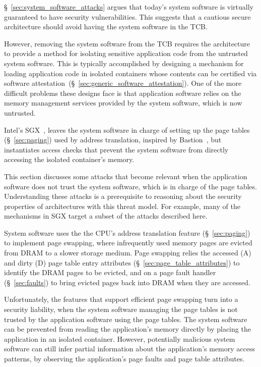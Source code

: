\label{sec:address_translation_attacks}

\S~\ref{sec:system_software_attacks} argues that today's system software is
virtually guaranteed to have security vulnerabilities. This suggests that a
cautious secure architecture should avoid having the system software in the
TCB.

However, removing the system software from the TCB requires the architecture to
provide a method for isolating sensitive application code from the untrusted
system software. This is typically accomplished by designing a mechanism for
loading application code in isolated containers whose contents can be certified
via software attestation~(\S~\ref{sec:generic_software_attestation}). One of the
more difficult problems these designs face is that application software
relies on the memory management services provided by the system software, which
is now untrusted.

Intel's SGX~\cite{mckeen2013sgx, anati2013sgx}, leaves the system software in
charge of setting up the page tables (\S~\ref{sec:paging}) used by address
translation, inspired by Bastion~\cite{champagne2010bastion}, but instantiates
access checks that prevent the system software from directly accessing the
isolated container's memory.

This section discusses some attacks that become relevant when the application
software does not trust the system software, which is in charge of the page
tables. Understanding these attacks is a prerequisite to reasoning about the
security properties of architectures with this threat model. For example, many
of the mechanisms in SGX target a subset of the attacks described here.


\label{sec:fault_tracking_attacks}

System software uses the the CPU's address translation feature
(\S~\ref{sec:paging}) to implement page swapping, where infrequently used
memory pages are evicted from DRAM to a slower storage medium. Page swapping
relies the accessed (A) and dirty (D) page table entry attributes
(\S~\ref{sec:page_table_attributes}) to identify the DRAM pages to be evicted,
and on a page fault handler (\S~\ref{sec:faults}) to bring evicted pages back
into DRAM when they are accessed.

Unfortunately, the features that support efficient page swapping turn into a
security liability, when the system software managing the page tables is not
trusted by the application software using the page tables. The system software
can be prevented from reading the application's memory directly by placing the
application in an isolated container. However, potentially malicious system
software can still infer partial information about the application's memory
access patterns, by observing the application's page faults and page table
attributes.

